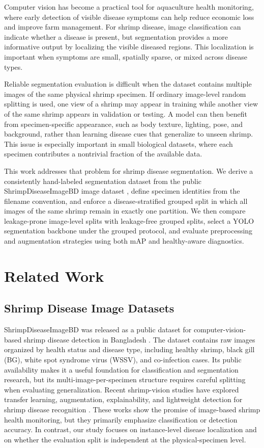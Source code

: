 \documentclass{svproc}
\begin{document}
Computer vision has become a practical tool for aquaculture health
monitoring, where early detection of visible disease symptoms can help
reduce economic loss and improve farm management. For shrimp disease,
image classification can indicate whether a disease is present, but
segmentation provides a more informative output by localizing the
visible diseased regions. This localization is important when symptoms
are small, spatially sparse, or mixed across disease types.

Reliable segmentation evaluation is difficult when the dataset contains
multiple images of the same physical shrimp specimen. If ordinary
image-level random splitting is used, one view of a shrimp may appear
in training while another view of the same shrimp appears in validation
or testing. A model can then benefit from specimen-specific appearance,
such as body texture, lighting, pose, and background, rather than
learning disease cues that generalize to unseen shrimp. This issue is
especially important in small biological datasets, where each specimen
contributes a nontrivial fraction of the available data.

This work addresses that problem for shrimp disease segmentation. We
derive a consistently hand-labeled segmentation dataset from the public
ShrimpDiseaseImageBD image dataset \cite{islam2025shrimpdiseaseimagebd},
define specimen identities from the filename convention, and enforce
a disease-stratified grouped split in which all images of the same
shrimp remain in exactly one partition. We then compare leakage-prone
image-level splits with leakage-free grouped splits, select a YOLO
segmentation backbone under the grouped protocol, and evaluate
preprocessing and augmentation strategies using both mAP and
healthy-aware diagnostics.
\section{Related Work}

\subsection{Shrimp Disease Image Datasets}

ShrimpDiseaseImageBD was released as a public dataset for
computer-vision-based shrimp disease detection in Bangladesh
\cite{islam2025shrimpdiseaseimagebd}. The dataset contains raw images
organized by health status and disease type, including healthy shrimp,
black gill (BG), white spot syndrome virus (WSSV), and co-infection
cases. Its public availability makes it a useful foundation for
classification and segmentation research, but its multi-image-per-specimen
structure requires careful splitting when evaluating generalization.
Recent shrimp-vision studies have explored transfer learning,
augmentation, explainability, and lightweight detection for shrimp
disease recognition \cite{jone2026shrimpxnet,fei2025lightweight}. These
works show the promise of image-based shrimp health monitoring, but they
primarily emphasize classification or detection accuracy. In contrast,
our study focuses on instance-level disease localization and on whether
the evaluation split is independent at the physical-specimen level.
\end{document}
